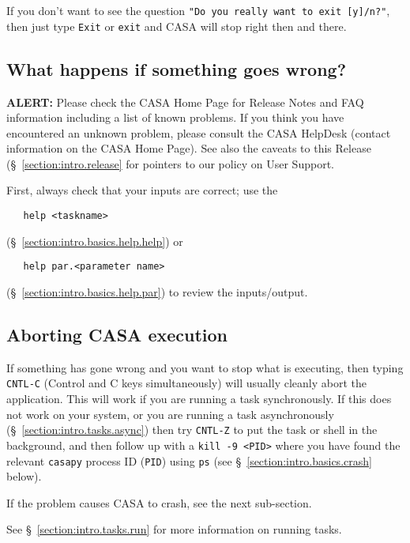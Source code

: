 If you don't want to see the question {\tt "Do you really want to exit
[y]/n?"}, then just type {\tt Exit} or {\tt exit} and CASA will stop
right then and there.

\subsection{What happens if something goes wrong?}
\label{section:intro.basics.wrong}

{\bf ALERT:} Please check the CASA Home Page for Release
Notes and FAQ information including a list of known problems.  If you think you
have encountered an unknown problem, please consult the CASA HelpDesk
(contact information on the CASA Home Page).  
See also the caveats to this Release (\S~\ref{section:intro.release} 
for pointers to our policy on User Support.

First, always check that your inputs are correct; use the
\small
\begin{verbatim}
   help <taskname>
\end{verbatim}
\normalsize
(\S~\ref{section:intro.basics.help.help}) or
\small
\begin{verbatim}
   help par.<parameter name>
\end{verbatim}
\normalsize
(\S~\ref{section:intro.basics.help.par}) to review the inputs/output.

\subsection{Aborting CASA execution}
\label{section:intro.basics.wrong.abort}

If something has gone wrong and you want to stop what is executing,
then typing {\tt CNTL-C} (Control and C keys simultaneously) will
usually cleanly abort the application. 
This will work if you are running a task synchronously.
If this does not work on your system, or you are running a task
asynchronously (\S~\ref{section:intro.tasks.async}) 
then try {\tt CNTL-Z} to put the task or shell in the
background, and then follow up with a {\tt kill -9 <PID>} where you
have found the relevant {\tt casapy} process ID ({\tt PID}) using 
{\tt ps} (see \S~\ref{section:intro.basics.crash} below).

If the problem causes CASA to crash, see the next sub-section.

See \S~\ref{section:intro.tasks.run} for more information on running
tasks.

